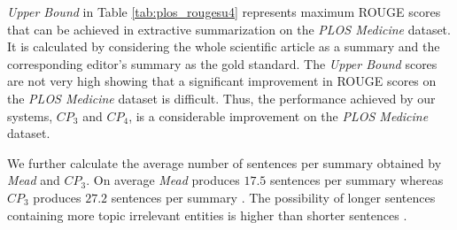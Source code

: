 \emph{Upper Bound} in Table \ref{tab:plos_rougesu4} represents maximum ROUGE scores
that can be achieved in extractive summarization on the \emph{PLOS Medicine} dataset.
It is calculated by considering the whole scientific article as a summary and the corresponding editor's summary as the gold standard.
The \emph{Upper Bound} scores are not very high showing that a significant improvement in ROUGE scores on  the \emph{PLOS Medicine} dataset is difficult.
Thus, the performance achieved by our systems, \emph{$CP_3$} and \emph{$CP_4$}, is a considerable improvement
on the \emph{PLOS Medicine} dataset.
%
%
%

We further calculate the average number of sentences per summary obtained by \emph{Mead} and \emph{$CP_3$}. On average \emph{Mead} produces $17.5$ sentences per summary whereas \emph{$CP_3$} produces $27.2$ sentences per summary%
. The possibility of longer sentences containing more topic irrelevant entities is higher than shorter sentences \cite{jinfeng10}.

